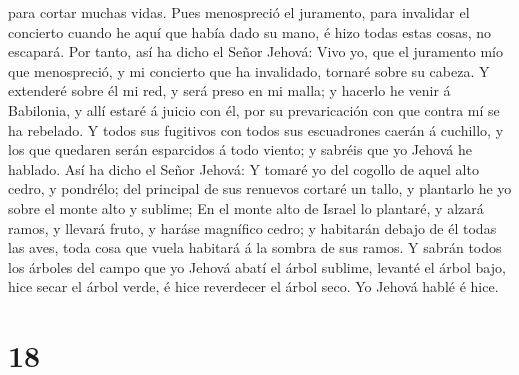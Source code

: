 para cortar muchas vidas.  Pues menospreció el juramento,
para invalidar el concierto cuando he aquí que había dado su mano, é
hizo todas estas cosas, no escapará.  Por tanto, así ha
dicho el Señor Jehová: Vivo yo, que el juramento mío que menospreció, y
mi concierto que ha invalidado, tornaré sobre su cabeza. 
Y extenderé sobre él mi red, y será preso en mi malla; y hacerlo he
venir á Babilonia, y allí estaré á juicio con él, por su prevaricación
con que contra mí se ha rebelado.  Y todos sus fugitivos
con todos sus escuadrones caerán á cuchillo, y los que quedaren serán
esparcidos á todo viento; y sabréis que yo Jehová he hablado.
 Así ha dicho el Señor Jehová: Y tomaré yo del cogollo de
aquel alto cedro, y pondrélo; del principal de sus renuevos cortaré un
tallo, y plantarlo he yo sobre el monte alto y sublime; 
En el monte alto de Israel lo plantaré, y alzará ramos, y llevará fruto,
y haráse magnífico cedro; y habitarán debajo de él todas las aves, toda
cosa que vuela habitará á la sombra de sus ramos.  Y
sabrán todos los árboles del campo que yo Jehová abatí el árbol sublime,
levanté el árbol bajo, hice secar el árbol verde, é hice reverdecer el
árbol seco. Yo Jehová hablé é hice.

\hypertarget{section-17}{%
\section{18}\label{section-17}}

